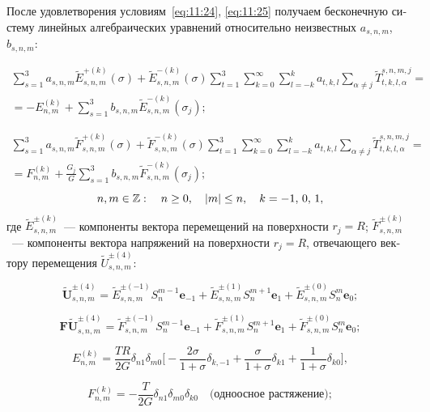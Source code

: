 \begin{russian}
После удовлетворения условиям~\eqref{eq:11:24}, \eqref{eq:11:25} получаем бесконечную систему линейных алгебраических уравнений относительно неизвестных $a_{s,n,m}$, $b_{s,n,m}$:

\begin{multline}
\sum\limits_{s=1}^3 a_{s,n,m}\tilde E_{s,n,m}^{+(k)}(\sigma)+\tilde E_{s,n,m}^{-(k)}(\sigma)\sum\limits_{t=1}^3\sum\limits_{k=0}^\infty\sum\limits_{l=-k}^k a_{t,k,l}\sum\limits_{\alpha\neq j}\tilde T_{t,k,l,\alpha}^{s,n,m,j}= \\
=-E_{n,m}^{(k)}+\sum\limits_{s=1}^3 b_{s,n,m}\tilde E_{s,n,m}^{-(k)}(\sigma_j);
\label{eq:11:28}
\end{multline}

\begin{multline}
\sum\limits_{s=1}^3 a_{s,n,m}\tilde F_{s,n,m}^{+(k)}(\sigma)+\tilde F_{s,n,m}^{-(k)}(\sigma)\sum\limits_{t=1}^3\sum\limits_{k=0}^\infty\sum\limits_{l=-k}^k a_{t,k,l}\sum\limits_{\alpha\neq j}\tilde T_{t,k,l,\alpha}^{s,n,m,j}= \\
=F_{n,m}^{(k)}+\frac{G_j}{G}\sum\limits_{s=1}^3 b_{s,n,m}\tilde F_{s,n,m}^{-(k)}(\sigma_j);
\label{eq:11:29}
\end{multline}
$$
n,m \in\mathbb{Z} :\quad n \ge 0,\quad |m| \le n,\quad k =  - 1,{\mkern 1mu} {\kern 1pt} 0,{\mkern 1mu} {\kern 1pt} 1,
$$
где $\tilde E_{s,n,m}^{\pm(k)}$~--- компоненты вектора перемещений на поверхности $r_j=R$; $\tilde F_{s,n,m}^{\pm(k)}$~--- компоненты вектора напряжений на поверхности $r_j=R$, отвечающего вектору перемещения $\tilde U_{s,n,m}^{\pm(4)}$:

$$
\mathbf{\tilde U}_{s,n,m}^{\pm(4)}=\tilde E_{s,n,m}^{\pm(-1)}S_n^{m-1}\mathbf{e}_{-1}+\tilde E_{s,n,m}^{\pm(1)}S_n^{m+1}\mathbf{e}_1+\tilde E_{s,n,m}^{\pm(0)}S_n^m\mathbf{e}_0;
$$

$$
\mathbf{F\tilde U}_{s,n,m}^{\pm(4)}=\tilde F_{s,n,m}^{\pm(-1)}S_n^{m-1}\mathbf{e}_{-1}+\tilde F_{s,n,m}^{\pm(1)}S_n^{m+1}\mathbf{e}_1+\tilde F_{s,n,m}^{\pm(0)}S_n^m\mathbf{e}_0;
$$

\begin{equation*}
E_{n,m}^{(k)} =\frac{TR}{2G}\delta_{n1}\delta_{m0}\bigg[-\frac{2\sigma}{1+\sigma}\delta_{k,-1}+\frac{\sigma}{1+\sigma}\delta_{k1}+\frac{1}{1+\sigma}\delta_{k0}\bigg],
\label{eq:11:19a}
\end{equation*}

\begin{equation*}
F_{n,m}^{(k)} =  -\frac{T}{2G}{\delta _{n1}}{\delta _{m0}}{\delta _{k0}}\quad\text{(одноосное растяжение)};
\label{eq:11:19}
\end{equation*}


\end{russian}
